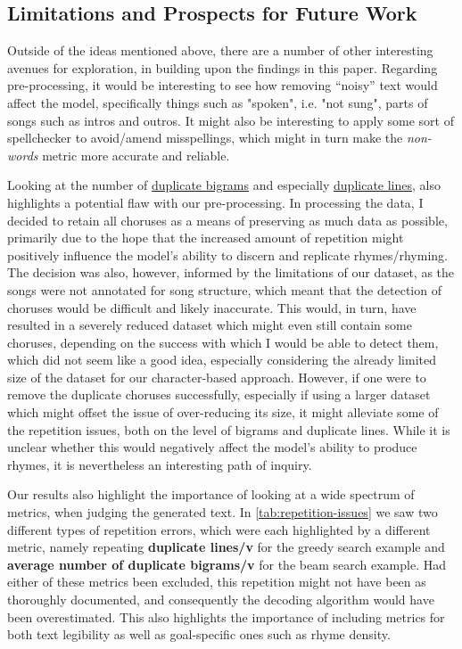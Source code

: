 \subsection{Limitations and Prospects for Future Work}
\label{sec:limitation+future-work}

Outside of the ideas mentioned above, there are a number of other interesting avenues for exploration, in building upon the findings in this paper. Regarding pre-processing, it would be interesting to see how removing “noisy” text would affect the model, specifically things such as "spoken", i.e. "not sung", parts of songs such as intros and outros. It might also be interesting to apply some sort of spellchecker to avoid/amend misspellings, which might in turn make the \textit{non-words} metric more accurate and reliable.

Looking at the number of \hyperref[fig:avg-bigrams]{duplicate bigrams} and especially \hyperref[fig:combined-param-eval]{duplicate lines}, also highlights a potential flaw with our pre-processing. In processing the data, I decided to retain all choruses as a means of preserving as much data as possible, primarily due to the hope that the increased amount of repetition might positively influence the model's ability to discern and replicate rhymes/rhyming. The decision was also, however, informed by the limitations of our dataset, as the songs were not annotated for song structure, which meant that the detection of choruses would be difficult and likely inaccurate. This would, in turn, have resulted in a severely reduced dataset which might even still contain some choruses, depending on the success with which I would be able to detect them, which did not seem like a good idea, especially considering the already limited size of the dataset for our character-based approach. However, if one were to remove the duplicate choruses successfully, especially if using a larger dataset which might offset the issue of over-reducing its size, it might alleviate some of the repetition issues, both on the level of bigrams and duplicate lines. While it is unclear whether this would negatively affect the model's ability to produce rhymes, it is nevertheless an interesting path of inquiry.

Our results also highlight the importance of looking at a wide spectrum of metrics, when judging the generated text. In \cref{tab:repetition-issues} we saw two different types of repetition errors, which were each highlighted by a different metric, namely repeating \textbf{duplicate lines/v} for the greedy search example and \textbf{average number of duplicate bigrams/v} for the beam search example. Had either of these metrics been excluded, this repetition might not have been as thoroughly documented, and consequently the decoding algorithm would have been overestimated. This also highlights the importance of including metrics for both text legibility as well as goal-specific ones such as rhyme density.


